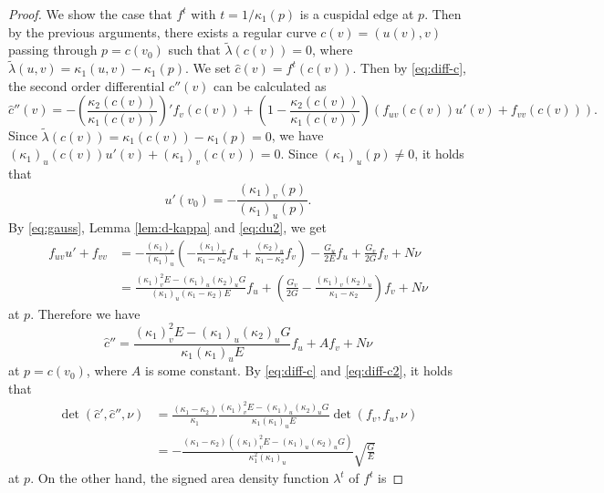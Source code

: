 \documentclass[11pt,a4paper,pdflatex,final]{amsart}
\theoremstyle{plain}
\theoremstyle{definition}
\theoremstyle{remark}
\newcommand{\0}{\bm{0}}
\newcommand{\til}{\tilde}
\numberwithin{equation}{section}
\begin{document}
\begin{proof}
	We show the case that $f^t$ with $t=1/\kappa_1(p)$ 
	is a cuspidal edge at $p$. 
	Then by the previous arguments, there exists a regular curve $c(v)=(u(v),v)$ 
	passing through $p=c(v_0)$ such that $\til{\lambda}(c(v))=0$, 
	where $\til{\lambda}(u,v)=\kappa_1(u,v)-\kappa_1(p)$. 
	We set $\hat{c}(v)=f^t(c(v))$. 
	Then by \eqref{eq:diff-c}, the second order differential $\hat{c}''(v)$ can be calculated as 
	\[
	\hat{c}''(v)=-\left(\frac{\kappa_2(c(v))}{\kappa_1(c(v))}\right)'f_v(c(v))
	+\left(1-\frac{\kappa_2(c(v))}{\kappa_1(c(v))}\right)(f_{uv}(c(v))u'(v)+f_{vv}(c(v))).
	\]
	Since $\til{\lambda}(c(v))=\kappa_1(c(v))-\kappa_1(p)=0$, we have 
	\(
	(\kappa_1)_u(c(v))u'(v)+(\kappa_1)_v(c(v))=0
	\). 
	Since $(\kappa_1)_u(p)\neq0$, it holds that 
	\begin{equation}\label{eq:du2}
		u'(v_0)=-\frac{(\kappa_1)_v(p)}{(\kappa_1)_u(p)}.
	\end{equation}
	By \eqref{eq:gauss}, Lemma \ref{lem:d-kappa} and \eqref{eq:du2}, 
	we get
	\[
	\begin{aligned}
		f_{uv}u'+f_{vv}
		&=-\frac{(\kappa_1)_v}{(\kappa_1)_u}
		\left(-\frac{(\kappa_1)_v}{\kappa_1-\kappa_2}f_u
		+\frac{(\kappa_2)_u}{\kappa_1-\kappa_2}f_v\right)
		-\frac{G_u}{2E}f_u+\frac{G_v}{2G}f_v+N\nu\\
		&=\frac{(\kappa_1)_v^2E-(\kappa_1)_u(\kappa_2)_uG}{(\kappa_1)_u(\kappa_1-\kappa_2)E}f_u
		+\left(\frac{G_v}{2G}-\frac{(\kappa_1)_v(\kappa_2)_u}{\kappa_1-\kappa_2}\right)f_v+N\nu
	\end{aligned}
	\]
	at $p$. 
	Therefore we have 
	\begin{equation}\label{eq:diff-c2}
		\hat{c}''=\frac{(\kappa_1)_v^2E-(\kappa_1)_u(\kappa_2)_uG}{\kappa_1(\kappa_1)_uE}f_u
		+Af_v+N\nu
	\end{equation}
	at $p=c(v_0)$, where $A$ is some constant. 
	By \eqref{eq:diff-c} and \eqref{eq:diff-c2}, it holds that 
	\begin{equation}\label{eq:det-para}
		\begin{aligned}
		\det(\hat{c}',\hat{c}'',\nu)
		&=\frac{(\kappa_1-\kappa_2)}{\kappa_1}\frac{(\kappa_1)_v^2E-(\kappa_1)_u(\kappa_2)_uG}{\kappa_1(\kappa_1)_uE}
		\det(f_v,f_u,\nu)\\
		&=-\frac{(\kappa_1-\kappa_2)((\kappa_1)_v^2E-(\kappa_1)_u(\kappa_2)_uG)}
		{\kappa_1^2(\kappa_1)_u}\sqrt{\frac{G}{E}}
		\end{aligned}
	\end{equation}
	at $p$. 
	On the other hand, the signed area density function $\lambda^t$ of $f^t$ is 

\end{proof}
\end{document}
